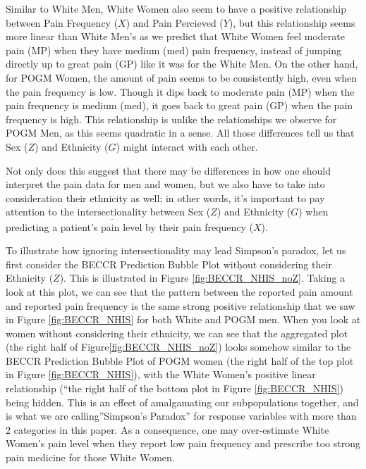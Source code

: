 \documentclass[
]{article}
\begin{document}
Similar to White Men, White Women also seem to have a positive
relationship between Pain Frequency (\(X\)) and Pain Percieved (\(Y\)),
but this relationship seems more linear than White Men's as we predict
that White Women feel moderate pain (MP) when they have medium (med)
pain frequency, instead of jumping directly up to great pain (GP) like
it was for the White Men. On the other hand, for POGM Women, the amount
of pain seems to be consistently high, even when the pain frequency is
low. Though it dips back to moderate pain (MP) when the pain frequency
is medium (med), it goes back to great pain (GP) when the pain frequency
is high. This relationship is unlike the relationships we observe for
POGM Men, as this seems quadratic in a sense. All those differences tell
us that Sex (\(Z\)) and Ethnicity (\(G\)) might interact with each
other.

Not only does this suggest that there may be differences in how one
should interpret the pain data for men and women, but we also have to
take into consideration their ethnicity as well; in other words, it's
important to pay attention to the
\(\underline{\text{intersectionality}}\) between Sex (\(Z\)) and
Ethnicity (\(G\)) when predicting a patient's pain level by their pain
frequency (\(X\)).

To illustrate how ignoring intersectionality may lead Simpson's paradox,
let us first consider the BECCR Prediction Bubble Plot
\(\underline{\text{without}}\) considering their Ethnicity (\(Z\)). This
is illustrated in Figure \ref{fig:BECCR_NHIS_noZ}. Taking a look at this
plot, we can see that the pattern between the reported pain amount and
reported pain frequency is the same strong positive relationship that we
saw in Figure \ref{fig:BECCR_NHIS} for both White and POGM men. When you
look at women without considering their ethnicity, we can see that the
aggregated plot (the right half of Figure\ref{fig:BECCR_NHIS_noZ}) looks
somehow similar to the BECCR Prediction Bubble Plot of POGM women (the
right half of the top plot in Figure \ref{fig:BECCR_NHIS}), with the
White Women's positive linear relationship (``the right half of the
bottom plot in Figure \ref{fig:BECCR_NHIS}) being hidden. This is an
effect of amalgamating our subpopulations together, and is what we are
calling''Simpson's Paradox'' for response variables with more than 2
categories in this paper. As a consequence, one may over-estimate White
Women's pain level when they report low pain frequency and prescribe too
strong pain medicine for those White Women.
\end{document}
